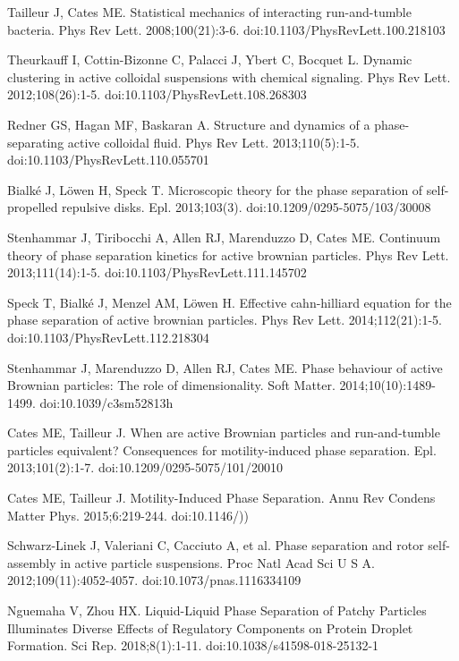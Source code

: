\documentclass[11pt]{article}
\begin{document}
\begin{thebibliography}{9}
Tailleur J, Cates ME. Statistical mechanics of interacting run-and-tumble bacteria. Phys Rev Lett. 2008;100(21):3-6. doi:10.1103/PhysRevLett.100.218103

Theurkauff I, Cottin-Bizonne C, Palacci J, Ybert C, Bocquet L. Dynamic clustering in active colloidal suspensions with chemical signaling. Phys Rev Lett. 2012;108(26):1-5. doi:10.1103/PhysRevLett.108.268303


Redner GS, Hagan MF, Baskaran A. Structure and dynamics of a phase-separating active colloidal fluid. Phys Rev Lett. 2013;110(5):1-5. doi:10.1103/PhysRevLett.110.055701

Bialké J, Löwen H, Speck T. Microscopic theory for the phase separation of self-propelled repulsive disks. Epl. 2013;103(3). doi:10.1209/0295-5075/103/30008

Stenhammar J, Tiribocchi A, Allen RJ, Marenduzzo D, Cates ME. Continuum theory of phase separation kinetics for active brownian particles. Phys Rev Lett. 2013;111(14):1-5. doi:10.1103/PhysRevLett.111.145702

Speck T, Bialké J, Menzel AM, Löwen H. Effective cahn-hilliard equation for the phase separation of active brownian particles. Phys Rev Lett. 2014;112(21):1-5. doi:10.1103/PhysRevLett.112.218304

Stenhammar J, Marenduzzo D, Allen RJ, Cates ME. Phase behaviour of active Brownian particles: The role of dimensionality. Soft Matter. 2014;10(10):1489-1499. doi:10.1039/c3sm52813h

Cates ME, Tailleur J. When are active Brownian particles and run-and-tumble particles equivalent? Consequences for motility-induced phase separation. Epl. 2013;101(2):1-7. doi:10.1209/0295-5075/101/20010

Cates ME, Tailleur J. Motility-Induced Phase Separation. Annu Rev Condens Matter Phys. 2015;6:219-244. doi:10.1146/))

Schwarz-Linek J, Valeriani C, Cacciuto A, et al. Phase separation and rotor self-assembly in active particle suspensions. Proc Natl Acad Sci U S A. 2012;109(11):4052-4057. doi:10.1073/pnas.1116334109

Nguemaha V, Zhou HX. Liquid-Liquid Phase Separation of Patchy Particles Illuminates Diverse Effects of Regulatory Components on Protein Droplet Formation. Sci Rep. 2018;8(1):1-11. doi:10.1038/s41598-018-25132-1


\end{thebibliography}
\end{document}
